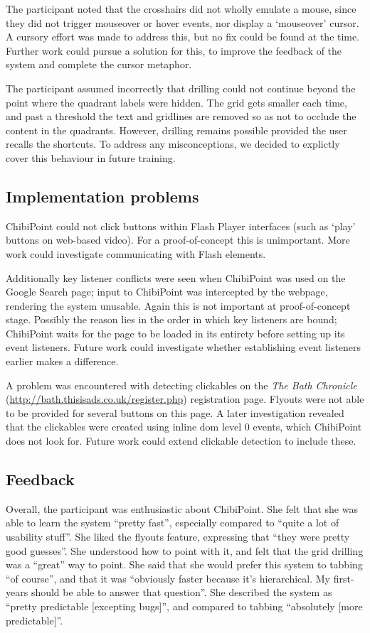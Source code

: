 \documentclass[11pt,openright,a4paper]{report}
\begin{document}
The participant noted that the crosshairs did not wholly emulate a mouse, since they did not trigger mouseover or hover events, nor display a `mouseover' cursor. A cursory effort was made to address this, but no fix could be found at the time. Further work could pursue a solution for this, to improve the feedback of the system and complete the cursor metaphor.

The participant assumed incorrectly that drilling could not continue beyond the point where the quadrant labels were hidden. The grid gets smaller each time, and past a threshold the text and gridlines are removed so as not to occlude the content in the quadrants. However, drilling remains possible provided the user recalls the shortcuts. To address any misconceptions, we decided to explictly cover this behaviour in future training.

\subsection{Implementation problems}
ChibiPoint could not click buttons within Flash Player interfaces (such as `play' buttons on web-based video). For a proof-of-concept this is unimportant. More work could investigate communicating with Flash elements.

Additionally key listener conflicts were seen when ChibiPoint was used on the Google Search page; input to ChibiPoint was intercepted by the webpage, rendering the system unusable. Again this is not important at proof-of-concept stage. Possibly the reason lies in the order in which key listeners are bound; ChibiPoint waits for the page to be loaded in its entirety before setting up its event listeners. Future work could investigate whether establishing event listeners earlier makes a difference.

A problem was encountered with detecting clickables on the \textit{The Bath Chronicle} (\url{http://bath.thisisads.co.uk/register.php}) registration page. Flyouts were not able to be provided for several buttons on this page. A later investigation revealed that the clickables were created using inline \gls{dom} level 0 events, which ChibiPoint does not look for. Future work could extend clickable detection to include these.

\subsection{Feedback}
\label{sec:usability_feedback}
Overall, the participant was enthusiastic about ChibiPoint. She felt that she was able to learn the system ``pretty fast'', especially compared to ``quite a lot of usability stuff''. She liked the flyouts feature, expressing that ``they were pretty good guesses''. She understood how to point with it, and felt that the grid drilling was a ``great'' way to point. She said that she would prefer this system to tabbing ``of course'', and that it was ``obviously faster because it's hierarchical. My first-years should be able to answer that question''. She described the system as ``pretty predictable [excepting bugs]'', and compared to tabbing ``absolutely [more predictable]''.
\end{document}
